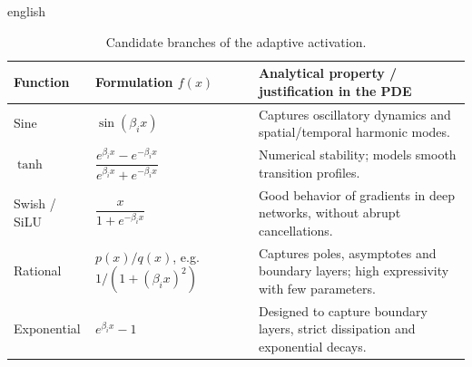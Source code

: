 \begin{hyphenrules}{english}
\begin{table}[htbp]
  \centering
  \caption{Candidate branches of the adaptive activation.}
  \label{tab:abu-branches}
  \small
  \begin{tabularx}{\linewidth}{@{}llX@{}}
    \toprule
    Function & Formulation $f(x)$ & Analytical property / justification in the PDE \\
    \midrule
    Sine & $\sin(\beta_ix)$ & Captures oscillatory dynamics and spatial/temporal harmonic modes. \\
    $\tanh$ & $\dfrac{e^{\beta_ix}-e^{-\beta_ix}}{e^{\beta_ix}+e^{-\beta_ix}}$ & Numerical stability; models smooth transition profiles. \\
    Swish / SiLU & $\dfrac{x}{1+e^{-\beta_ix}}$ & Good behavior of gradients in deep networks, without abrupt cancellations. \\
    Rational & $p(x)/q(x)$, e.g.\ $1/(1+(\beta_ix)^2)$ & Captures poles, asymptotes and boundary layers; high expressivity with few parameters. \\
    Exponential & $e^{\beta_ix}-1$ & Designed to capture boundary layers, strict dissipation and exponential decays. \\
    \bottomrule
  \end{tabularx}
\end{table}

\end{hyphenrules}
